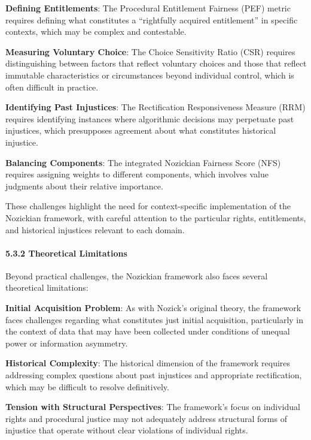 \textbf{Defining Entitlements}: The Procedural Entitlement Fairness
(PEF) metric requires defining what constitutes a ``rightfully acquired
entitlement'' in specific contexts, which may be complex and
contestable.

\textbf{Measuring Voluntary Choice}: The Choice Sensitivity Ratio (CSR)
requires distinguishing between factors that reflect voluntary choices
and those that reflect immutable characteristics or circumstances beyond
individual control, which is often difficult in practice.

\textbf{Identifying Past Injustices}: The Rectification Responsiveness
Measure (RRM) requires identifying instances where algorithmic decisions
may perpetuate past injustices, which presupposes agreement about what
constitutes historical injustice.

\textbf{Balancing Components}: The integrated Nozickian Fairness Score
(NFS) requires assigning weights to different components, which involves
value judgments about their relative importance.

These challenges highlight the need for context-specific implementation
of the Nozickian framework, with careful attention to the particular
rights, entitlements, and historical injustices relevant to each domain.

\paragraph{5.3.2 Theoretical Limitations}\label{theoretical-limitations}

Beyond practical challenges, the Nozickian framework also faces several
theoretical limitations:

\textbf{Initial Acquisition Problem}: As with Nozick's original theory,
the framework faces challenges regarding what constitutes just initial
acquisition, particularly in the context of data that may have been
collected under conditions of unequal power or information asymmetry.

\textbf{Historical Complexity}: The historical dimension of the
framework requires addressing complex questions about past injustices
and appropriate rectification, which may be difficult to resolve
definitively.

\textbf{Tension with Structural Perspectives}: The framework's focus on
individual rights and procedural justice may not adequately address
structural forms of injustice that operate without clear violations of
individual rights.

